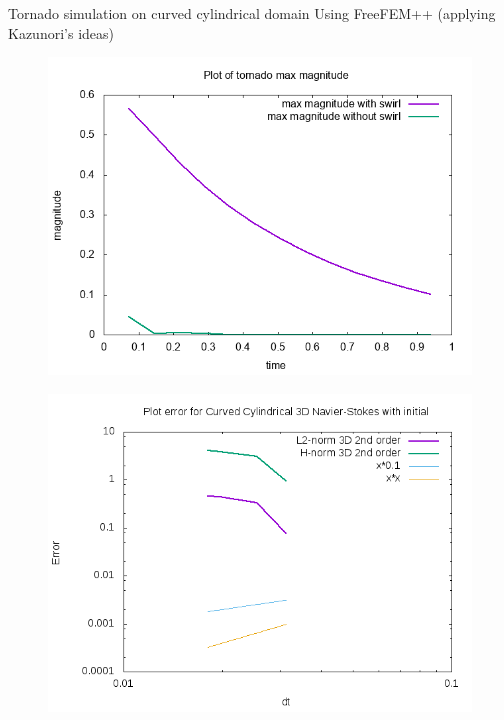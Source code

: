 \documentclass{beamer}
\begin{document}
\begin{frame}{Tornado simulation on curved cylindrical domain}
Using FreeFEM++ (applying Kazunori's ideas)
\begin{figure}
	\centering
	\includegraphics[width=0.9\linewidth]{NS_3D/curved}
	\caption{}
	\label{fig:curved}
\end{figure}
\end{frame}

\begin{frame}
\begin{figure}
	\centering
	\includegraphics[width=0.9\linewidth]{NS_3D/error_curved}
	\caption{}
	\label{fig:errorcurved}
\end{figure}

\end{frame}
\end{document}

